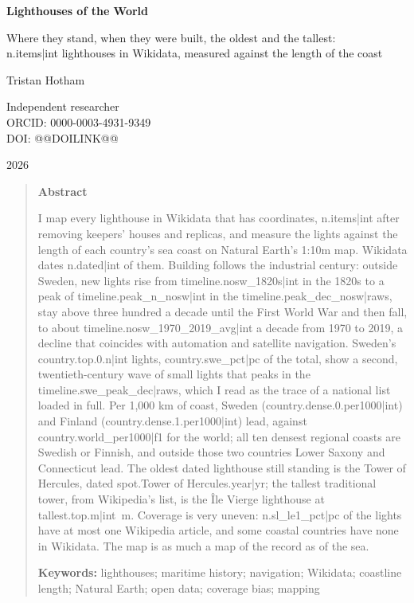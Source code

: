 \documentclass[11pt,a4paper]{article}
\begin{document}
\begin{center}
{\Large\bfseries Lighthouses of the World\par}
\vspace{0.4em}
{\large Where they stand, when they were built, the oldest and the tallest:\\{{n.items|int}} lighthouses in Wikidata, measured against the length of the coast\par}
\vspace{1.2em}
{\large Tristan Hotham\par}
\vspace{0.3em}
{\small Independent researcher\\
ORCID: 0000-0003-4931-9349\\
DOI: @@DOILINK@@\par}
\vspace{0.8em}
2026
\end{center}

\begin{quote}
\small
\begin{center}\textbf{Abstract}\end{center}
I map every lighthouse in Wikidata that has coordinates, {{n.items|int}} after removing keepers' houses and replicas, and measure the lights against the length of each country's sea coast on Natural Earth's 1:10m map. Wikidata dates {{n.dated|int}} of them. Building follows the industrial century: outside Sweden, new lights rise from {{timeline.nosw_1820s|int}} in the 1820s to a peak of {{timeline.peak_n_nosw|int}} in the {{timeline.peak_dec_nosw|raw}}s, stay above three hundred a decade until the First World War and then fall, to about {{timeline.nosw_1970_2019_avg|int}} a decade from 1970 to 2019, a decline that coincides with automation and satellite navigation. Sweden's {{country.top.0.n|int}} lights, {{country.swe_pct|pc}} of the total, show a second, twentieth-century wave of small lights that peaks in the {{timeline.swe_peak_dec|raw}}s, which I read as the trace of a national list loaded in full. Per 1,000 km of coast, Sweden ({{country.dense.0.per1000|int}}) and Finland ({{country.dense.1.per1000|int}}) lead, against {{country.world_per1000|f1}} for the world; all ten densest regional coasts are Swedish or Finnish, and outside those two countries Lower Saxony and Connecticut lead. The oldest dated lighthouse still standing is the Tower of Hercules, dated {{spot.Tower of Hercules.year|yr}}; the tallest traditional tower, from Wikipedia's list, is the Île Vierge lighthouse at {{tallest.top.m|int}}~m. Coverage is very uneven: {{n.sl_le1_pct|pc}} of the lights have at most one Wikipedia article, and some coastal countries have none in Wikidata. The map is as much a map of the record as of the sea.

\textbf{Keywords:} lighthouses; maritime history; navigation; Wikidata; coastline length; Natural Earth; open data; coverage bias; mapping
\end{quote}
\end{document}

